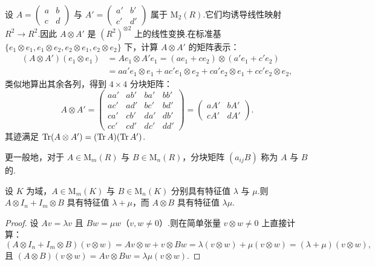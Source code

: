 \begin{example}[Kronecker 积]\label{ex:kronecker-prod}
设 $A = \begin{pmatrix} a & b \\ c & d \end{pmatrix}$ 与 $A' = \begin{pmatrix} a' & b' \\ c' & d' \end{pmatrix}$ 属于 $\mathrm{M}_2(R)$.它们均诱导线性映射 $R^2 \to R^2$.因此 $A \otimes A'$ 是 $(R^2)^{\otimes 2}$ 上的线性变换.在标准基 $\{e_1 \otimes e_1, e_1 \otimes e_2, e_2 \otimes e_1, e_2 \otimes e_2\}$ 下，计算 $A \otimes A'$ 的矩阵表示：
\begin{align*}
  (A \otimes A')(e_1 \otimes e_1) &= Ae_1 \otimes A'e_1 = (ae_1 + ce_2) \otimes (a'e_1 + c'e_2) \\
  &= aa' e_1 \otimes e_1 + ac' e_1 \otimes e_2 + ca' e_2 \otimes e_1 + cc' e_2 \otimes e_2,
\end{align*}
类似地算出其余各列，得到 $4 \times 4$ 分块矩阵：
\[
  A \otimes A' = \begin{pmatrix}
    aa' & ab' & ba' & bb' \\
    ac' & ad' & bc' & bd' \\
    ca' & cb' & da' & db' \\
    cc' & cd' & dc' & dd'
  \end{pmatrix} = \begin{pmatrix}
    a A' & b A' \\
    c A' & d A'
  \end{pmatrix}.
\]
其迹满足 $\operatorname{Tr}(A \otimes A') = (\operatorname{Tr} A)(\operatorname{Tr} A')$.

更一般地，对于 $A \in \mathrm{M}_m(R)$ 与 $B \in \mathrm{M}_n(R)$，分块矩阵 $(a_{ij} B)$ 称为 $A$ 与 $B$ 的.
\end{example}

\begin{theorem}[特征值乘积定理]\label{thm:eigen-tensor}
设 $K$ 为域，$A \in \mathrm{M}_m(K)$ 与 $B \in \mathrm{M}_n(K)$ 分别具有特征值 $\lambda$ 与 $\mu$.则 $A \otimes I_n + I_m \otimes B$ 具有特征值 $\lambda + \mu$，而 $A \otimes B$ 具有特征值 $\lambda \mu$.
\end{theorem}

\begin{proof}
设 $Av = \lambda v$ 且 $Bw = \mu w$（$v, w \neq 0$）.则在简单张量 $v \otimes w \neq 0$ 上直接计算：
\[
  (A \otimes I_n + I_m \otimes B)(v \otimes w) = Av \otimes w + v \otimes Bw = \lambda(v \otimes w) + \mu(v \otimes w) = (\lambda + \mu)(v \otimes w),
\]
且 $(A \otimes B)(v \otimes w) = Av \otimes Bw = \lambda \mu(v \otimes w)$.
\end{proof}

